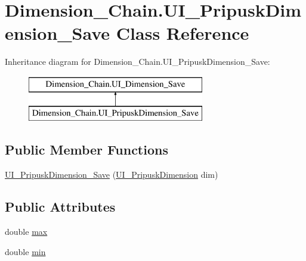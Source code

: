 \hypertarget{class_dimension___chain_1_1_u_i___pripusk_dimension___save}{}\section{Dimension\+\_\+\+Chain.\+U\+I\+\_\+\+Pripusk\+Dimension\+\_\+\+Save Class Reference}
\label{class_dimension___chain_1_1_u_i___pripusk_dimension___save}
Inheritance diagram for Dimension\+\_\+\+Chain.\+U\+I\+\_\+\+Pripusk\+Dimension\+\_\+\+Save\+:\begin{figure}[H]
\begin{center}
\leavevmode
\includegraphics[height=2.000000cm]{class_dimension___chain_1_1_u_i___pripusk_dimension___save}
\end{center}
\end{figure}
\subsection*{Public Member Functions}
\begin{DoxyCompactItemize}
\item 
\mbox{\hyperlink{class_dimension___chain_1_1_u_i___pripusk_dimension___save_a5eaa1096da02b3f5dff6c6a2a8f0237d}{U\+I\+\_\+\+Pripusk\+Dimension\+\_\+\+Save}} (\mbox{\hyperlink{class_dimension___chain_1_1_u_i___pripusk_dimension}{U\+I\+\_\+\+Pripusk\+Dimension}} dim)
\end{DoxyCompactItemize}
\subsection*{Public Attributes}
\begin{DoxyCompactItemize}
\item 
double \mbox{\hyperlink{class_dimension___chain_1_1_u_i___pripusk_dimension___save_aaa4e1820ebace0d4cf7952bae2b8d012}{max}}
\item 
double \mbox{\hyperlink{class_dimension___chain_1_1_u_i___pripusk_dimension___save_a80d76285a268b8b24dba1c8d5160133a}{min}}
\end{DoxyCompactItemize}


